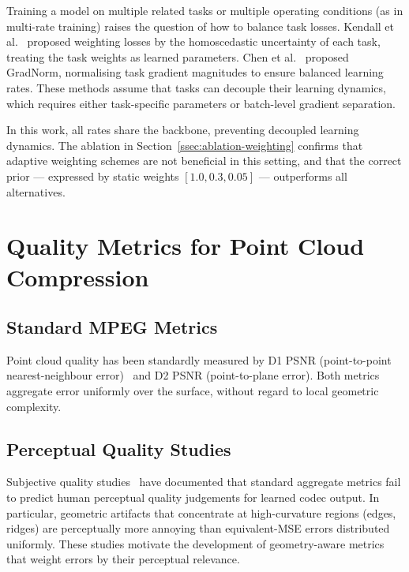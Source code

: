 Training a model on multiple related tasks or multiple operating conditions
(as in multi-rate training) raises the question of how to balance task losses.
Kendall et al.~\cite{kendall2018multi} proposed weighting losses by the
homoscedastic uncertainty of each task, treating the task weights as learned
parameters.
Chen et al.~\cite{chen2018gradnorm} proposed GradNorm, normalising task
gradient magnitudes to ensure balanced learning rates.
These methods assume that tasks can decouple their learning dynamics,
which requires either task-specific parameters or batch-level gradient
separation.

In this work, all rates share the backbone, preventing decoupled learning
dynamics.
The ablation in Section~\ref{ssec:ablation-weighting} confirms that adaptive
weighting schemes are not beneficial in this setting, and that the correct
prior --- expressed by static weights $[1.0, 0.3, 0.05]$ --- outperforms
all alternatives.

\section{Quality Metrics for Point Cloud Compression}
\label{sec:related-metrics}

\subsection{Standard MPEG Metrics}

Point cloud quality has been standardly measured by D1 PSNR
(point-to-point nearest-neighbour error)~\cite{tian2017geometric}
and D2 PSNR (point-to-plane error).
Both metrics aggregate error uniformly over the surface, without regard to
local geometric complexity.

\subsection{Perceptual Quality Studies}

Subjective quality studies~\cite{ak2024basics,prazeres2024quality} have
documented that standard aggregate metrics fail to predict human perceptual
quality judgements for learned codec output.
In particular, geometric artifacts that concentrate at high-curvature
regions (edges, ridges) are perceptually more annoying than equivalent-MSE
errors distributed uniformly.
These studies motivate the development of geometry-aware metrics that weight
errors by their perceptual relevance.

